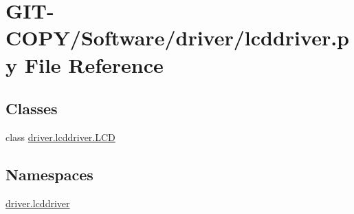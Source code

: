 \hypertarget{GIT-COPY_2Software_2driver_2lcddriver_8py}{}\section{G\+I\+T-\/\+C\+O\+P\+Y/\+Software/driver/lcddriver.py File Reference}
\label{GIT-COPY_2Software_2driver_2lcddriver_8py}
\subsection*{Classes}
\begin{DoxyCompactItemize}
\item 
class \hyperlink{classdriver_1_1lcddriver_1_1LCD}{driver.\+lcddriver.\+L\+C\+D}
\end{DoxyCompactItemize}
\subsection*{Namespaces}
\begin{DoxyCompactItemize}
\item 
 \hyperlink{namespacedriver_1_1lcddriver}{driver.\+lcddriver}
\end{DoxyCompactItemize}
